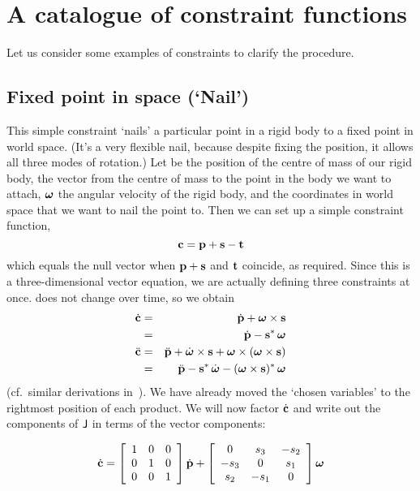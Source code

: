 \section{A catalogue of constraint functions\label{constraintAppendix}}

Let us consider some examples of constraints to clarify the procedure.

\subsection{Fixed point in space (`Nail')\label{constrNail}}

This simple constraint `nails' a particular point in a rigid body to a fixed point
in world space. (It's a very flexible nail, because despite fixing the position, it allows all
three modes of rotation.) Let  be the position of the centre of mass of our rigid
body,  the vector from the centre of mass to the point in the body we want to attach,
$\ve{\omega}$ the angular velocity of the rigid body, and  the coordinates in world
space that we want to nail the point to. Then we can set up a simple constraint function,
\begin{equation}
\ve{c} = \ve{p} + \ve{s} - \ve{t}
\end{equation}
which equals the null vector when $\ve{p}+\ve{s}$ and $\ve{t}$ coincide, as required.
Since this is a three-dimensional vector equation, we are actually defining three constraints
at once.  does not change over time, so we obtain
\begin{eqnarray}
\dot{\ve{c}} &=& \dot{\ve{p}} + \ve{\omega}\times\ve{s} \nonumber\\
&=& \dot{\ve{p}} - \dual{\ve{s}}\,\ve{\omega} \\
\ddot{\ve{c}} &=& \ddot{\ve{p}} + \dot{\ve{\omega}}\times\ve{s} +
    \ve{\omega}\times(\ve{\omega}\times\ve{s}) \nonumber\\
&=& \ddot{\ve{p}} - \dual{\ve{s}}\,\dot{\ve{\omega}} -
    \dual{(\ve{\omega}\times\ve{s})}\,\ve{\omega}
\end{eqnarray}
(cf.\ similar derivations in~\cite{Kalra:95}). We have already moved the `chosen variables' to
the rightmost position of each product. We will now factor $\dot{\ve{c}}$ and write out the
components of $\mathsf{J}$ in terms of the vector components:

\begin{equation}
\label{constrEx1J}
\dot{\ve{c}} = \left[\begin{array}{ccc} 1&0&0\\0&1&0\\0&0&1 \end{array}\right]
    \dot{\ve{p}} + \left[\begin{array}{ccc}
    0 & s_3 & -s_2 \\ -s_3 & 0 & s_1 \\ s_2 & -s_1 & 0
    \end{array}\right] \ve{\omega}
\end{equation}

